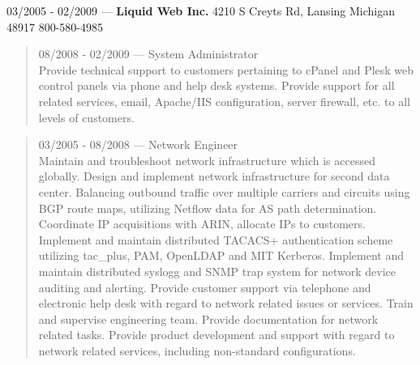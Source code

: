 03/2005 - 02/2009 --- {\bf Liquid Web Inc.} 4210 S Creyts Rd, Lansing Michigan 48917 800-580-4985
\begin{quote}
08/2008 - 02/2009 --- System Administrator\\
Provide technical support to customers pertaining to cPanel and Plesk web control panels via phone and help desk systems.  Provide support for all related services, email, Apache/IIS configuration, server firewall, etc. to all levels of customers.
\end{quote}
\begin{quote}
03/2005 - 08/2008 --- Network Engineer\\
Maintain and troubleshoot network infrastructure which is accessed globally.  Design and implement network infrastructure for second data center.  Balancing outbound traffic over multiple carriers and circuits using BGP route maps, utilizing Netflow data for AS path determination.  Coordinate IP acquisitions with ARIN, allocate IPs to customers.  Implement and maintain distributed TACACS+ authentication scheme utilizing tac\_plus, PAM, OpenLDAP and MIT Kerberos.  Implement and maintain distributed syslogg and SNMP trap system  for network device auditing and alerting.  Provide customer support via telephone and electronic help desk with regard to network related issues or services.  Train and supervise engineering team.  Provide documentation for network related tasks.  Provide product development and support with regard to network related services, including non-standard configurations.
\end{quote}
